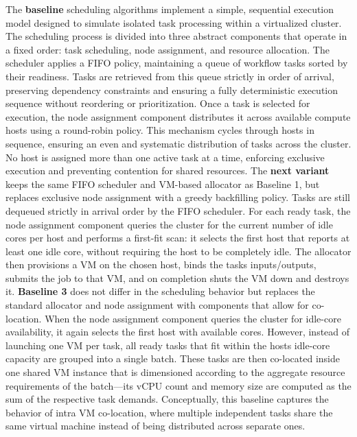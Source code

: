 The \textbf{baseline} scheduling algorithms implement a simple, sequential execution model designed to simulate isolated task processing within a virtualized cluster. The scheduling process is divided into three abstract components that operate in a fixed order: task scheduling, node assignment, and resource allocation. The scheduler applies a FIFO policy, maintaining a queue of workflow tasks sorted by their readiness. Tasks are retrieved from this queue strictly in order of arrival, preserving dependency constraints and ensuring a fully deterministic execution sequence without reordering or prioritization.
Once a task is selected for execution, the node assignment component distributes it across available compute hosts using a round-robin policy. This mechanism cycles through hosts in sequence, ensuring an even and systematic distribution of tasks across the cluster. No host is assigned more than one active task at a time, enforcing exclusive execution and preventing contention for shared resources.
The \textbf{next variant} keeps the same FIFO scheduler and VM-based allocator as Baseline 1, but replaces exclusive node assignment with a greedy backfilling policy. Tasks are still dequeued strictly in arrival order by the FIFO scheduler. For each ready task, the node assignment component queries the cluster for the current number of idle cores per host and performs a first-fit scan: it selects the first host that reports at least one idle core, without requiring the host to be completely idle. The allocator then provisions a VM on the chosen host, binds the tasks inputs/outputs, submits the job to that VM, and on completion shuts the VM down and destroys it.
\textbf{Baseline 3} does not differ in the scheduling behavior but replaces the standard allocator and node assignment with components that allow for co-location. When the node assignment component queries the cluster for idle-core availability, it again selects the first host with available cores. However, instead of launching one VM per task, all ready tasks that fit within the hosts idle-core capacity are grouped into a single batch. These tasks are then co-located inside one shared VM instance that is dimensioned according to the aggregate resource requirements of the batch—its vCPU count and memory size are computed as the sum of the respective task demands.
Conceptually, this baseline captures the behavior of intra VM co-location, where multiple independent tasks share the same virtual machine instead of being distributed across separate ones.
